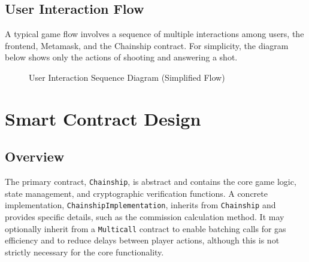\documentclass{article}
\begin{document}
    \subsection{User Interaction Flow}

    A typical game flow involves a sequence of multiple interactions among users, the frontend, Metamask, and the Chainship contract. For simplicity, the diagram below shows only the actions of shooting and answering a shot.

    \begin{figure}[H]
        \noindent{}
        \caption{User Interaction Sequence Diagram (Simplified Flow)}
        \label{fig:sequence_diagram}
    \end{figure}

    \section{Smart Contract Design}

    \subsection{Overview}
    The primary contract, \texttt{Chainship}, is abstract and contains the core game logic, state management, and cryptographic verification functions. A concrete implementation, \texttt{Chainship\-Implementation}, inherits from \texttt{Chainship} and provides specific details, such as the commission calculation method. It may optionally inherit from a \texttt{Multicall} contract to enable batching calls for gas efficiency and to reduce delays between player actions, although this is not strictly necessary for the core functionality.
\end{document}
